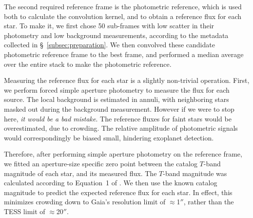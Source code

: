 \documentclass[12pt,twocolumn,tighten]{aastex62}
\begin{document}
The second required reference frame is the
photometric reference, which is used both to calculate the
convolution kernel, and to obtain a
reference flux for each star.  
To make it, we first chose 50
sub-frames with low scatter in their photometry
and low background measurements, according to the metadata collected
in \S~\ref{subsec:preparation}.
We then convolved these candidate photometric reference frame to the best
frame, and performed a median average over the entire stack
to make the photometric reference.


Measuring the reference flux for each star is a slightly non-trivial
operation.
First, we perform forced simple aperture photometry to measure
the flux for each source.
The local background is estimated in annuli, with neighboring stars
masked out during the background measurement.
However if we were to stop here, {\it it would be a bad mistake}.
The reference fluxes for faint stars would be overestimated, due to
crowding.
The relative amplitude of photometric signals would correspondingly
be biased small, hindering exoplanet detection.

Therefore, after performing simple aperture photometry on the 
reference frame, we fitted an aperture-size specific zero point
between the catalog $T$-band magnitude of each star, and its
measured flux.
The $T$-band magnitude was calculated according to Equation~1 of 
\citet{stassun_TIC8_2019}.
We then use the known catalog magnitude to predict the expected
reference flux for each star.
In effect, this minimizes crowding down to Gaia's resolution limit of
$\approx$1$''$, rather than the TESS limit of $\approx$20$''$.
\end{document}
